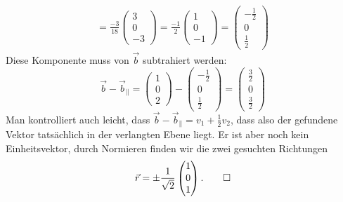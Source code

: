 \begin{loesung}
\begin{teilaufgaben}
\begin{align*}
=
\frac{-3}{18}\begin{pmatrix}3\\0\\-3\end{pmatrix}
=
\frac{-1}{2}\begin{pmatrix}1\\0\\-1\end{pmatrix}
=
\begin{pmatrix}-\frac12\\0\\\frac12\end{pmatrix}
\end{align*}
Diese Komponente muss von $\vec b$ subtrahiert werden:
\[
\vec b -\vec b_{\|}
=\begin{pmatrix}1\\0\\2\end{pmatrix}
-
\begin{pmatrix}-\frac12\\0\\\frac12\end{pmatrix}
=
\begin{pmatrix}\frac32\\0\\\frac32\end{pmatrix}
\]
Man kontrolliert auch leicht, dass
$\vec b -\vec b_{\|} = v_1+\frac12v_2$, dass also der gefundene
Vektor tatsächlich in der verlangten Ebene liegt.
Er ist aber noch kein Einheitsvektor, durch Normieren finden wir
die zwei gesuchten Richtungen
\[
\vec r=\pm\frac1{\sqrt{2}}\begin{pmatrix}1\\0\\1\end{pmatrix}.
\qedhere
\]
\end{teilaufgaben}
\end{loesung}

